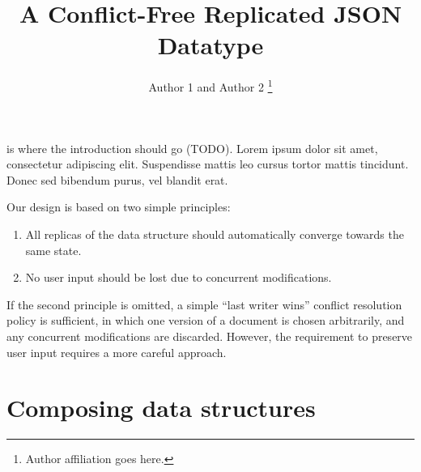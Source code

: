 \documentclass[10pt,journal,compsoc]{IEEEtran}
\begin{document}
\sloppy
\title{A Conflict-Free Replicated JSON Datatype}
\author{Author 1 and Author 2
\thanks{Author affiliation goes here.}}

\maketitle


 is where the introduction should go (TODO). Lorem ipsum dolor sit amet, consectetur adipiscing elit. Suspendisse mattis leo cursus tortor mattis tincidunt. Donec sed bibendum purus, vel blandit erat.

%

Our design is based on two simple principles:
\begin{enumerate}
\item All replicas of the data structure should automatically converge towards the same state.
\item No user input should be lost due to concurrent modifications.
\end{enumerate}

If the second principle is omitted, a simple ``last writer wins'' conflict resolution policy is sufficient, in which one version of a document is chosen arbitrarily, and any concurrent modifications are discarded. However, the requirement to preserve user input requires a more careful approach.

\section{Composing data structures}
\end{document}
